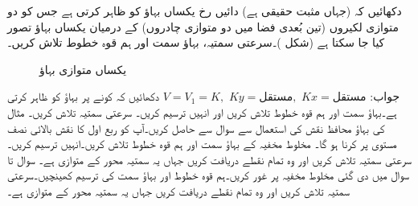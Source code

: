 
\quad {} \quad
دکھائیں کہ  (جہاں  مثبت حقیقی ہے) دائیں رخ یکساں بہاؤ کو ظاہر کرتی ہے جس کو دو متوازی لکیروں (تین بُعدی فضا میں دو متوازی چادروں) کے درمیان یکساں بہاؤ تصور کیا جا سکتا ہے (شکل )۔سرعتی  سمتیہ، بہاؤ سمت اور ہم قوہ خطوط تلاش کریں۔
\begin{figure}
\centering
{}
\caption{یکساں متوازی بہاؤ}
\label{شکل_مخفی_قوہ_یکساں_متوازی_بہاو}
\end{figure}

جواب:\quad
$V=V_1=K,\,\, Ky=\text{مستقل},\,\, Kx=\text{مستقل}$
\quad 
دکھائیں کہ کونے پر بہاؤ کو  ظاہر کرتی ہے۔بہاؤ سمت اور ہم قوہ خطوط تلاش کریں اور انہیں ترسیم کریں۔ سرعتی  سمتیہ  تلاش کریں۔
\quad
مثال  کی بہاؤ محافظ نقش کی استعمال سے سوال  سے حاصل کریں۔آپ کو ربع اول کا نقش بالائی نصف مستوی پر کرنا ہو گا۔
\quad
مخلوط مخفیہ  کے بہاؤ سمت اور ہم قوہ خطوط تلاش کریں۔انہیں ترسیم کریں۔سرعتی سمتیہ  تلاش کریں اور وہ تمام نقطے دریافت کریں جہاں یہ سمتیہ محور  کے متوازی ہے۔
سوال  تا سوال  میں دی گئی مخلوط مخفیہ  پر غور کریں۔ہم قوہ خطوط اور بہاؤ سمت کی ترسیم کھینچیں۔سرعتی سمتیہ  تلاش کریں اور وہ تمام نقطے دریافت کریں جہاں یہ سمتیہ محور  کے متوازی ہے۔

